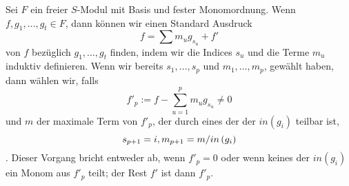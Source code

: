 \documentclass{article}
\begin{document}
\begin{algo}
	Sei 
	\( F \)
	ein freier 
	\( S\)-Modul
	mit Basis und fester Monomordnung.
	Wenn
	\( f,g_1,\dots,g_t \in F \),
	dann k\"onnen wir einen Standard Ausdruck
	\[
                f=\sum m_u g_{s_u} +f'
	\]
	von
	\( f \)
	bez\"uglich 
	\( g_1,\dots,g_t \)
	finden,
	indem wir die Indices
	\( s_{u} \)
	und die Terme
	\(m_{u} \)
	induktiv definieren.
	Wenn wir bereits 
	\( s_1,\dots,s_p \)
	und
	\( m_1,\dots,m_p\),
	gew\"ahlt haben,
	dann w\"ahlen wir, 
	falls 
	\[
		f'_p:=f-\sum_{u=1}^{p} m_u g_{s_u} \neq 0
	\]
	und
	\( m \) 
	der maximale Term von 
	\(f'_p \),
	der durch eines der der
	\( in\left( g_i \right) \)
	teilbar ist,
	\[
		s_{p+1}=i , \\
		m_{p+1}=m / in\left( g_i \right)
	\].
	Dieser Vorgang bricht entweder ab, wenn 
	\( f'_p=0 \)
	oder wenn keines der
	\( in\left( g_i \right) \) 
	ein Monom aus 
	\( f'_p\)
	teilt;
	der Rest 
	\(f'\) 
	ist dann 
	\( f'_p \).
\end{algo}
\end{document}
